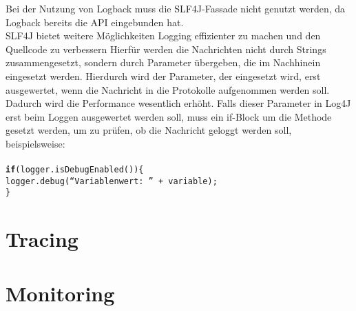 {    Bei der Nutzung von Logback muss die SLF4J-Fassade nicht genutzt werden, da Logback bereits die API eingebunden hat.
    \\
    SLF4J bietet weitere Möglichkeiten Logging effizienter zu machen und den Quellcode zu verbessern
    Hierfür werden die Nachrichten nicht durch Strings zusammengesetzt, sondern durch Parameter übergeben, die im Nachhinein eingesetzt werden.
    Hierdurch wird der Parameter, der eingesetzt wird, erst ausgewertet, wenn die Nachricht in die Protokolle aufgenommen werden soll.
    Dadurch wird die Performance wesentlich erhöht.
    Falls dieser Parameter in Log4J erst beim Loggen ausgewertet werden soll, muss ein if-Block um die Methode gesetzt werden, um zu prüfen, ob die Nachricht geloggt werden soll, beispielsweise:
    \\
    \\
    \hspace*{10mm}
    \texttt{\textbf{if}(logger.isDebugEnabled())\{
    \\
    \hspace*{15mm}
    logger.debug(\enquote{Variablenwert: } + variable);
    \\
    \hspace*{10mm}
    \}
    }
}\autocite{baeldung-slf, rheinwerk}

%


\section{Tracing}\label{sec:tracing-verfahren}



\section{Monitoring}\label{sec:monitoring-verfahren}




